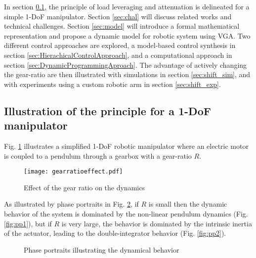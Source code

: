 In section \ref{sec:princ}, the principle of load leveraging and attenuation is delineated for a simple 1-DoF manipulator. Section \ref{sec:chal} will discuss related works and technical challenges. Section \ref{sec:model} will introduce a formal mathematical representation and propose a dynamic model for robotic system using VGA. Two different control approaches are explored, a model-based control synthesis in section \ref{sec:HierachicalControlApproach}, and a computational approach in section \ref{sec:DynamicProgrammingAproach}. The advantage of actively changing the gear-ratio are then illustrated with simulations in section \ref{sec:shift_sim}, and with experiments using a custom robotic arm in section \ref{sec:shift_exp}.

\subsection{Illustration of the principle for a 1-DoF manipulator}
\label{sec:princ}

Fig. \ref{fig:bigpicture} illustrates a simplified 1-DoF robotic manipulator where an electric motor is coupled to a pendulum through a gearbox with a gear-ratio $R$.

\begin{figure}[H]
	\centering
		\texttt{[image: gearratioeffect.pdf]}
	\caption{Effect of the gear ratio on the dynamics}
	\label{fig:bigpicture}
\end{figure}

As illustrated by phase portraits in Fig. \ref{fig:pp}, if $R$ is small then the dynamic behavior of the system is dominated by the non-linear pendulum dynamics (Fig. \ref{fig:pp1}), but if $R$ is very large, the behavior is dominated by the intrinsic inertia of the actuator, leading to the double-integrator behavior (Fig. \ref{fig:pp2}).

\begin{figure}[H]
        \centering
        \caption{Phase portraits illustrating the dynamical behavior}
				\label{fig:pp}
\end{figure}

